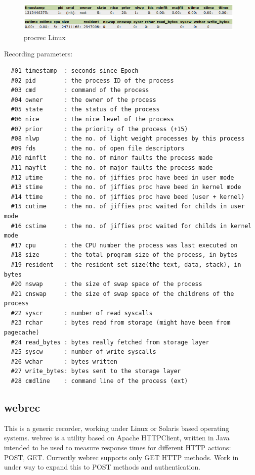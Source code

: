 \begin{figure}[!ht]
\centering
\includegraphics[scale=0.62]{procrec_lin.png}
\caption{procrec Linux}
\label{fig:procrec_lin}
\end{figure}

\noindent
Recording parameters:

\begin{verbatim}
  #01 timestamp  : seconds since Epoch
  #02 pid        : the process ID of the process
  #03 cmd        : command of the process
  #04 owner      : the owner of the process
  #05 state      : the status of the process
  #06 nice       : the nice level of the process
  #07 prior      : the priority of the process (+15)
  #08 nlwp       : the no. of light weight processes by this process
  #09 fds        : the no. of open file descriptors
  #10 minflt     : the no. of minor faults the process made
  #11 mayflt     : the no. of major faults the process made
  #12 utime      : the no. of jiffies proc have beed in user mode
  #13 stime      : the no. of jiffies proc have beed in kernel mode
  #14 ttime      : the no. of jiffies proc have beed (user + kernel)
  #15 cutime     : the no. of jiffies proc waited for childs in user mode
  #16 cstime     : the no. of jiffies proc waited for childs in kernel mode
  #17 cpu        : the CPU number the process was last executed on
  #18 size       : the total program size of the process, in bytes
  #19 resident   : the resident set size(the text, data, stack), in bytes
  #20 nswap      : the size of swap space of the process
  #21 cnswap     : the size of swap space of the childrens of the process
  #22 syscr      : number of read syscalls
  #23 rchar      : bytes read from storage (might have been from pagecache)
  #24 read_bytes : bytes really fetched from storage layer
  #25 syscw      : number of write syscalls
  #26 wchar      : bytes written
  #27 write_bytes: bytes sent to the storage layer
  #28 cmdline    : command line of the process (ext)
\end{verbatim}



\subsection*{webrec}
This is a generic recorder, working under Linux or Solaris based
operating systems.  webrec is a utility based on Apache HTTPClient, 
written in Java intended to be used to measure response times for different 
HTTP actions: POST, GET. Currently webrec supports only GET HTTP methods. 
Work in under way to expand this to POST methods and authentication.

